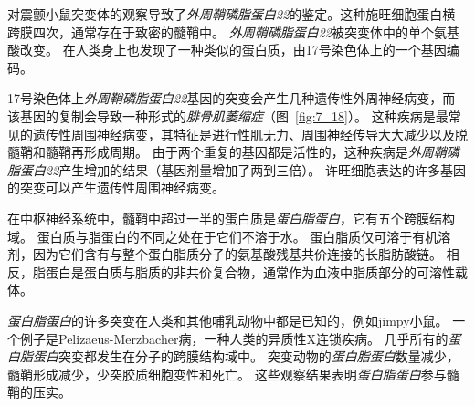 \begin{proposition}[髓鞘蛋白缺陷破坏神经信号传导]
	\quad 对震颤小鼠突变体的观察导致了\textit{外周鞘磷脂蛋白22}的鉴定。这种施旺细胞蛋白横跨膜四次，通常存在于致密的髓鞘中。
	\textit{外周鞘磷脂蛋白22}被突变体中的单个氨基酸改变。
	在人类身上也发现了一种类似的蛋白质，由17号染色体上的一个基因编码。
	
	\quad \quad 17号染色体上\textit{外周鞘磷脂蛋白22}基因的突变会产生几种遗传性外周神经病变，而该基因的复制会导致一种形式的\textit{腓骨肌萎缩症}（图~\ref{fig:7_18}）。
	这种疾病是最常见的遗传性周围神经病变，其特征是进行性肌无力、周围神经传导大大减少以及脱髓鞘和髓鞘再形成周期。
	由于两个重复的基因都是活性的，这种疾病是\textit{外周鞘磷脂蛋白22}产生增加的结果（基因剂量增加了两到三倍）。
	许旺细胞表达的许多基因的突变可以产生遗传性周围神经病变。
	
	\quad \quad 在中枢神经系统中，髓鞘中超过一半的蛋白质是\textit{蛋白脂蛋白}，它有五个跨膜结构域。
	蛋白质与脂蛋白的不同之处在于它们不溶于水。
	蛋白脂质仅可溶于有机溶剂，因为它们含有与整个蛋白脂质分子的氨基酸残基共价连接的长脂肪酸链。
	相反，脂蛋白是蛋白质与脂质的非共价复合物，通常作为血液中脂质部分的可溶性载体。
	
	\quad \quad \textit{蛋白脂蛋白}的许多突变在人类和其他哺乳动物中都是已知的，例如jimpy小鼠。
	一个例子是Pelizaeus-Merzbacher病，一种人类的异质性X连锁疾病。
	几乎所有的\textit{蛋白脂蛋白}突变都发生在分子的跨膜结构域中。
	突变动物的\textit{蛋白脂蛋白}数量减少，髓鞘形成减少，少突胶质细胞变性和死亡。
	这些观察结果表明\textit{蛋白脂蛋白}参与髓鞘的压实。
	
\end{proposition}


